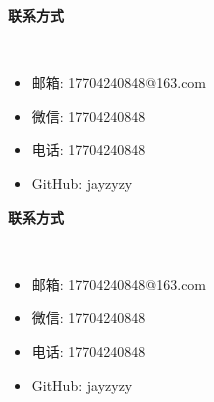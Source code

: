\documentclass[a4paper,10pt]{article}
\begin{document}
\noindent \colorbox{BlueBlack4}{\begin{minipage}{0.99\textwidth}{\textbf{联系方式 }}\end{minipage}}\\[-0.3cm]
\begin{itemize}[noitemsep,nolistsep]
    \item 邮箱: 17704240848@163.com
    \item 微信: 17704240848
    \item 电话: 17704240848
    \item GitHub: jayzyzy
\end{itemize}

\noindent \colorbox{BlueBlack5}{\begin{minipage}{0.99\textwidth}{\textbf{联系方式 }}\end{minipage}}\\[-0.3cm]
\begin{itemize}[noitemsep,nolistsep]
    \item 邮箱: 17704240848@163.com
    \item 微信: 17704240848
    \item 电话: 17704240848
    \item GitHub: jayzyzy
\end{itemize}
\end{document}
